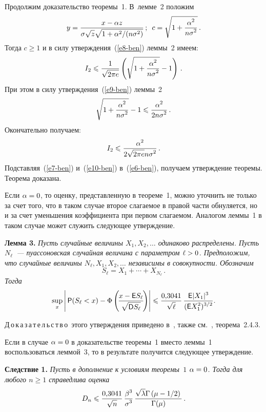 \begin{multicols}{2}
\smallskip

Продолжим доказательство теоремы~1. В~лемме~2 положим
$$
y=\displaystyle\frac{\displaystyle x-\alpha z\mathstrut}{\displaystyle \sigma\sqrt{z}\sqrt{1+{\alpha^2}/({n\sigma^2})}\mathstrut}\,;\enskip
c=\sqrt{1+\displaystyle\frac{\displaystyle \alpha^2\mathstrut}{\displaystyle n\sigma^2\mathstrut}}\,.
$$
Тогда $c\geqslant1$ и в силу утверждения~(\ref{e8-ben}) леммы~2 имеем:
$$
I_2\leqslant\displaystyle\frac{\displaystyle 1\mathstrut}{\displaystyle \sqrt{2\pi e}\mathstrut}\left(\sqrt{1+\displaystyle\frac{\displaystyle \alpha^2\mathstrut}{\displaystyle n\sigma^2\mathstrut}}-1\right)\,.
$$
При этом в силу утверждения~(\ref{e9-ben}) леммы~2
$$
\sqrt{1+\displaystyle\frac{\displaystyle \alpha^2\mathstrut}{\displaystyle n\sigma^2\mathstrut}}-1\leqslant\displaystyle\frac{\displaystyle \alpha^2\mathstrut}{\displaystyle 2n\sigma^2\mathstrut}\,.
$$
Окончательно получаем:
\begin{equation}
I_2\leqslant\displaystyle\frac{\displaystyle \alpha^2\mathstrut}{\displaystyle 2\sqrt{2\pi e}n\sigma^2\mathstrut}\,.\label{e10-ben}
\end{equation}
Подставляя~(\ref{e7-ben}) и~(\ref{e10-ben}) в~(\ref{e6-ben}), получаем утверждение теоремы. 
Теорема доказана.

\smallskip

Если $\alpha\hm=0$, то оценку, представленную в теореме~1, можно
уточнить не только за счет того, что в таком случае второе слагаемое
в правой части обнуляется, но и за счет уменьшения коэффициента при
первом слагаемом. Аналогом леммы~1 в таком случае может служить
следующее утверждение.

\smallskip

\noindent
\textbf{Лемма 3.} \textit{Пусть случайные величины $X_1,X_2,\ldots$
одинаково распределены. Пусть $N_{\ell}$~--- пуассоновская случайная
величина с параметром $\ell\hm>0$. Предположим, что случайные величины
$N_{\ell},X_1,X_2,\ldots$ независимы в совокупности. Обозначим
$$
S_{\ell}=X_1+\cdots+X_{N_{\ell}}\,.
$$
Тогда}
$$
\sup_x\left\vert\,{\sf P}(S_{\ell}<x)-\Phi\left(\!\displaystyle\frac{\displaystyle x-{\sf E}S_{\ell}\mathstrut}{\displaystyle \sqrt{{\sf D}S_{\ell}}\mathstrut}
\!\right)\right\vert\leqslant\displaystyle\frac{\displaystyle 0{,}3041\mathstrut}{\displaystyle \sqrt{\ell}\mathstrut}\,
\displaystyle\frac{\displaystyle {\sf E}|X_1|^3\mathstrut}{\displaystyle ({\sf E}X_1^2)^{3/2}\mathstrut}.
$$

\smallskip

\noindent
Д\,о\,к\,а\,з\,а\,т\,е\,л\,ь\,с\,т\,в\,о\ этого утверждения приведено 
в~\cite{KorolevShevtsova2010}, также см.~\cite{KorolevBeningShorgin2011}, теорема~2.4.3.

\smallskip

Если в случае $\alpha\hm=0$ в доказательстве теоремы~1 вместо леммы~1
воспользоваться леммой~3, то в результате получится следующее
утверждение.

\smallskip

\noindent
\textbf{Следствие 1.} \textit{Пусть в дополнение к условиям теоремы~$1$
$\alpha\hm=0$. Тогда для любого $n\geqslant1$ справедлива оценка}
$$
D_n\leqslant\displaystyle\frac{\displaystyle 0{,}3041\mathstrut}{\displaystyle \sqrt{n}\mathstrut}\,
\displaystyle\frac{\displaystyle \beta^3\mathstrut}{\displaystyle \sigma^3\mathstrut}\,\displaystyle\frac{\displaystyle \sqrt{\lambda}\Gamma\left(\mu-{1}/{2}\right)\mathstrut}{\displaystyle \Gamma(\mu)\mathstrut}\,.
$$


\end{multicols}
